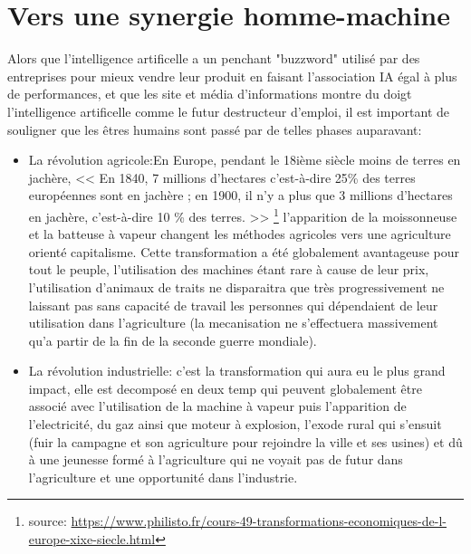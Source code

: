 \part{Vers une synergie homme-machine}
    Alors que l'intelligence artificelle a un penchant "buzzword" utilisé par des entreprises pour 
    mieux vendre leur produit en faisant l'association IA égal à plus de performances, et que les 
    site et média d'informations montre du doigt l'intelligence artificelle comme le futur destructeur 
    d'emploi, il est important de souligner que les êtres humains sont passé par de telles phases 
    auparavant: \newline 

    \begin{itemize}
        \item La révolution agricole:En Europe, pendant le 18ième siècle moins de terres en jachère,
        << En 1840, 7 millions d'hectares c'est-à-dire 25\% 
        des terres européennes sont en jachère ; en 1900, il n'y a plus que 3
         millions d'hectares en jachère, c'est-à-dire 10 \% des terres. >>
         \footnote{source: \url{https://www.philisto.fr/cours-49-transformations-economiques-de-l-europe-xixe-siecle.html}}
         l'apparition de la moissonneuse et la batteuse à vapeur changent les méthodes agricoles 
         vers une agriculture orienté capitalisme. 
         Cette transformation a été globalement avantageuse pour tout le peuple, l'utilisation 
         des machines étant rare à cause de leur prix, l'utilisation d'animaux de traits ne 
         disparaitra que très progressivement ne laissant pas sans capacité de travail les personnes
         qui dépendaient de leur utilisation dans l'agriculture (la mecanisation ne s'effectuera 
         massivement qu'a partir de la fin de la seconde guerre mondiale). \newline 

         \item La révolution industrielle: c'est la transformation qui aura eu le plus grand impact,
         elle est decomposé en deux temp qui peuvent globalement être associé avec 
         l'utilisation de la machine à vapeur puis l'apparition de l'electricité, du gaz ainsi que 
         moteur à explosion, l'exode rural qui s'ensuit (fuir la campagne et son agriculture pour 
         rejoindre la ville et ses usines) et dû à une jeunesse formé à l'agriculture 
         qui ne voyait pas de futur dans l'agriculture et une opportunité dans l'industrie. \newline
    \end{itemize}

